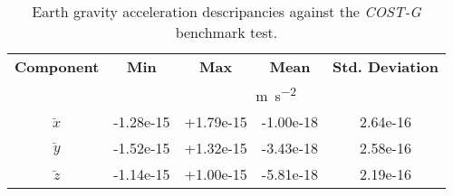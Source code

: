 \begin{table}[h!]
  \centering
  \begin{tabular}{ccccc}
      \textbf{Component} & \textbf{Min} & \textbf{Max} & \textbf{Mean} & \textbf{Std. Deviation}\\
      & \multicolumn{4}{c}{\si{\metre\per\square\second}} \\
      \hline
      $\ddot{x}$ & -1.28e-15 & +1.79e-15 & -1.00e-18 & 2.64e-16 \\
      $\ddot{y}$ & -1.52e-15 & +1.32e-15 & -3.43e-18 & 2.58e-16 \\
      $\ddot{z}$ & -1.14e-15 & +1.00e-15 & -5.81e-18 & 2.19e-16 \\
      \hline
  \end{tabular}
  \caption{Earth gravity acceleration descripancies against the \emph{COST-G} benchmark test.}
  \label{table:costg-benchmark-02gravityfield-itrf}
\end{table}
